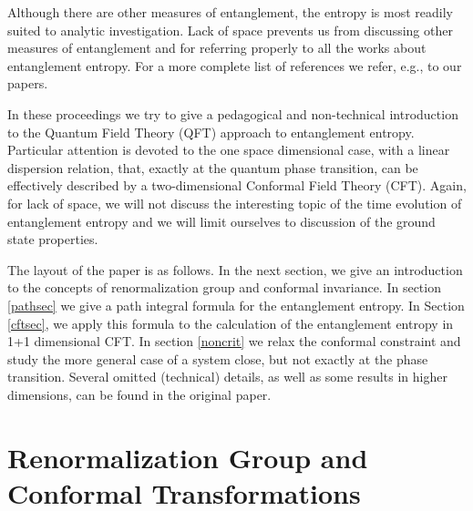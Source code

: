 \documentclass{ws-ijqi}
\begin{document}
Although there are other measures of entanglement,
the entropy is most readily suited to analytic investigation.
Lack of space prevents us from discussing other measures of entanglement 
and for referring properly to all the works about entanglement entropy.
For a more complete list of references we refer, e.g., to our 
papers.\cite{cc-04,cc-05}

In these proceedings we try to give a pedagogical and non-technical 
introduction to the Quantum Field Theory (QFT) approach to entanglement
entropy.\cite{cc-04} 
Particular attention is devoted to the one space dimensional 
case, with a linear dispersion relation, that, exactly at the quantum phase 
transition, can be effectively described by a two-dimensional Conformal 
Field Theory (CFT).
Again, for lack of space, we will not discuss the interesting topic of 
the time evolution of entanglement entropy\cite{cc-05} and we will limit
ourselves to discussion of the ground state properties.


The layout of the paper is as follows. In the next section, we 
give an introduction to the concepts of renormalization group 
and conformal invariance. 
In section \ref{pathsec} we
give a path integral formula for the entanglement entropy. 
In Section \ref{cftsec}, we apply this formula to the calculation of the 
entanglement entropy in 1+1 dimensional CFT. In section \ref{noncrit}
we relax the conformal constraint and study the more general case of a 
system close, but not exactly at the phase transition.
Several omitted (technical) details, as well as some results in higher 
dimensions, can be found in the original paper.\cite{cc-04}




\section{Renormalization Group and Conformal Transformations}
\end{document}
